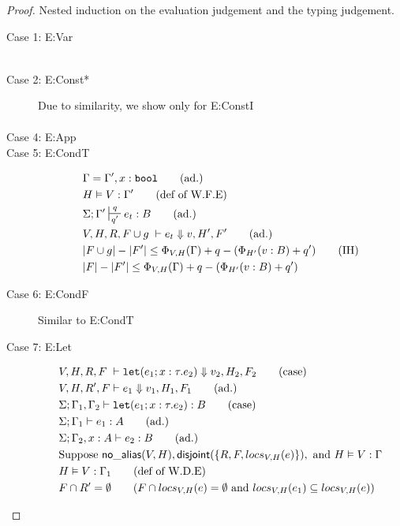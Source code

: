 \documentclass[11pt]{article}
\newcommand{\irl}[1]{\mathtt{#1}}
\newcommand{\na}[1]{\mathsf{no\_alias}(#1)}
\newcommand{\dist}[1]{\mathsf{disjoint}(#1)}
\begin{document}
\begin{proof}
Nested induction on the evaluation judgement and the typing judgement.\\
\begin{description}
  \item[Case 1: E:Var]
  \begin{align}
  &
  \end{align}
  \item[Case 2: E:Const*]
  Due to similarity, we show only for E:ConstI
  \begin{align*}
  
  \end{align*}
  \item[Case 4: E:App]
  \item[Case 5: E:CondT]
  \begin{align*}
  &\Gamma = \Gamma', x : \irl{bool} \tag{ad.}\\
  &H \vDash V : \Gamma' \tag{def of W.F.E}\\
  &\Sigma; \Gamma' \sststile{q'}{q} e_t : B \tag{ad.}\\
  &V,H,R,F \cup g\; \vdash e_t \Downarrow v, H',F' \tag{ad.}\\
  &|F \cup g| - |F'| \le \Phi_{V,H}(\Gamma) +q - (\Phi_{H'}(v:B) + q') \tag{IH}\\
  &|F| - |F'| \le \Phi_{V,H}(\Gamma) +q - (\Phi_{H'}(v:B) + q') \\
  \end{align*}
  \item[Case 6: E:CondF] 
  Similar to E:CondT
  \item [Case 7: E:Let]
  \begin{align*}
  &V,H,R,F \; \vdash \irl{let}(e_1; x : \tau.e_2) \Downarrow v_2,H_2,F_2 \tag{case}\\
  &V,H,R',F \vdash e_1 \Downarrow v_1,H_1,F_1 \tag{ad.}\\
  &\Sigma; \Gamma_1,\Gamma_2 \vdash \irl{let}(e_1; x : \tau.e_2) : B \tag{case}\\
  &\Sigma; \Gamma_1 \vdash e_1 : A \tag{ad.}\\
  &\Sigma; \Gamma_2, x : A \vdash e_2 : B \tag{ad.}\\
  &\text{Suppose } \na{V,H}, \dist{\{R,F,locs_{V,H}(e)\}}, \text{ and } H \vDash V : \Gamma\\
  &H \vDash V : \Gamma_1 \tag{def of W.D.E}\\
  &F \cap R' = \emptyset \tag{$F \cap locs_{V,H}(e) = \emptyset$ and $locs_{V,H}(e_1) \subseteq locs_{V,H}(e)$}\\

\end{align*}
\end{description}
\end{proof}
\end{document}
